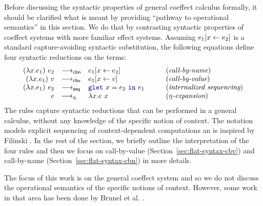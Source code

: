Before discussing the syntactic properties of general coeffect calculus formally, it should be 
clarified what is meant by providing ``pathway to operational semantics'' in this section. We do
that by contrasting syntactic properties of coeffect systems with more familiar effect systems.
Assuming $e_1[x \leftarrow e_2]$ is a standard capture-avoiding syntactic substitution, the following
equations define four syntactic reductions on the terms:
%
\begin{equation*}
\begin{array}{rllcl}
(\lambda x.e_1)~e_2 &{\reduce_{\ident{cbn}}}& \subst{e_1}{x}{e_2}   &&(\textit{call-by-name})\\
(\lambda x.e_1)~v   &{\reduce_{\ident{cbv}}}& \subst{e_1}{x}{v}     &\quad&(\textit{call-by-value})\\
(\lambda x.e_1)~e_2 &{\reduce_{\ident{seq}}}& \kvd{glet}~x=e_2~\kvd{in}~e_1  &&(\textit{internalized sequencing})\\
e &{\reduce_\eta}& \lambda x.e~x                                    &&(\textit{$\eta$-expansion})
\end{array}
\end{equation*}
%
The rules capture syntactic reductions that can be performed in a general calculus, without any 
knowledge of the specific notion of context. The  notation models explicit sequencing
of context-dependent computations an is inspired by Filinski \cite{monads-inaction}. In the rest
of the section, we briefly outline the interpretation of the four rules and then we focus on
call-by-value (Section~\ref{sec:flat-syntax-cbv}) and call-by-name (Section~\ref{sec:flat-syntax-cbn})
in more details.

The focus of this work is on the general coeffect system and so we do not discuss the operational
semantics of the specific notions of context. However, some work in that area has been done
by Brunel et al. \cite{coeffects-quantitative}.

